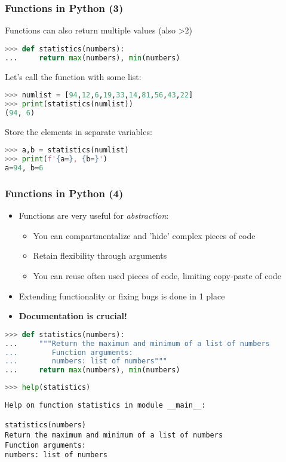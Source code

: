\begin{frame}[fragile]
  \frametitle{Functions in Python (3)}
  Functions can also return multiple values (also >2)
  \begin{lstlisting}[language=Python, numbers=none]
>>> def statistics(numbers):
...     return max(numbers), min(numbers)
  \end{lstlisting}\pause
  Let's call the function with some list:
  \begin{lstlisting}[language=Python, numbers=none]
>>> numlist = [94,12,6,19,33,14,81,56,43,22]
>>> print(statistics(numlist))
(94, 6)
  \end{lstlisting}\pause
  Store the elements in separate variables:
  \begin{lstlisting}[language=Python, numbers=none]
>>> a,b = statistics(numlist)
>>> print(f'{a=}, {b=}')
a=94, b=6
  \end{lstlisting}
\end{frame}

{\nologo
\begin{frame}[fragile]
  \frametitle{Functions in Python (4)}
  \begin{itemize}
    \item Functions are very useful for \emph{abstraction}:
    \begin{itemize}
      \item You can compartmentalize and 'hide' complex pieces of code\
      \item Retain flexibility through arguments
      \item You can reuse often used pieces of code, limiting copy-paste of code
    \end{itemize}
    \item Extending functionality or fixing bugs is done in 1 place\pause
    \item \bfseries{Documentation is crucial!}\pause
  \end{itemize}
  \begin{lstlisting}[language=Python, numbers=none]
>>> def statistics(numbers):
...     """Return the maximum and minimum of a list of numbers
...        Function arguments:
...        numbers: list of numbers"""
...     return max(numbers), min(numbers)
  \end{lstlisting}\pause
  \begin{lstlisting}[language=Python, numbers=none]
>>> help(statistics)
  \end{lstlisting}
  \begin{lstlisting}[style=PyOutput,keywords={statistics},keywordstyle=\bfseries]
Help on function statistics in module __main__:

statistics(numbers)
Return the maximum and minimum of a list of numbers
Function arguments:
numbers: list of numbers
  \end{lstlisting}
\end{frame}
}

